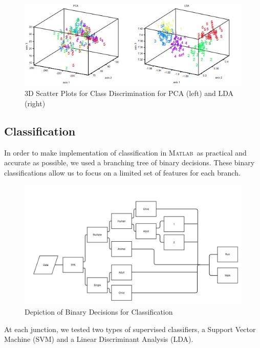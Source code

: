 \documentclass{article}[11pt]
\newcommand{\Matlab}{\textsc{Matlab}}
\begin{document}
\begin{figure}[H]
   \centering
   \includegraphics[scale = 0.6]{Images/PCAvLDA.jpeg} %
   \caption{3D Scatter Plots for Class Discrimination for PCA (left) and LDA (right)\cite{GutierrezPP}}
   \label{fig:PCALDA}
\end{figure}

\subsection{Classification}
\label{sec:classify}
In order to make implementation of classification in \Matlab \ as practical and accurate as possible, we used a branching tree of binary decisions. These binary classifications allow us to focus on a limited set of features for each branch.

\begin{figure}[H]
   \centering
   \includegraphics[scale = 0.4]{Images/Decision Tree.jpg} %
   \caption{Depiction of Binary Decisions for Classification}
   \label{fig:BinTree}
\end{figure}

At each junction, we tested two types of supervised classifiers, a Support Vector Machine (SVM) and a Linear Discriminant Analysis (LDA).
\end{document}
